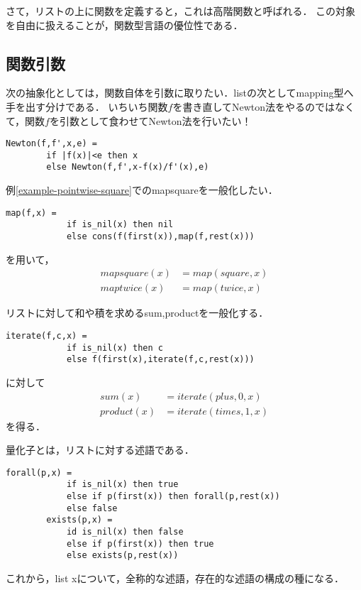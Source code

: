 \documentclass[uplatex, 12pt, dvipdfmx]{jsreport}
\begin{document}
さて，リストの上に関数を定義すると，これは高階関数と呼ばれる．
この対象を自由に扱えることが，関数型言語の優位性である．

\subsection{関数引数}

次の抽象化としては，関数自体を引数に取りたい．listの次としてmapping型へ手を出す分けである．
いちいち関数$f$を書き直してNewton法をやるのではなくて，関数$f$を引数として食わせてNewton法を行いたい！
\begin{lstlisting}[caption=Newton method]
    Newton(f,f',x,e) = 
        if |f(x)|<e then x
        else Newton(f,f',x-f(x)/f'(x),e)
\end{lstlisting}

\begin{example}[map]
    例\ref{example-pointwise-square}でのmapsquareを一般化したい．
    \begin{lstlisting}[caption=map]
        map(f,x) =
            if is_nil(x) then nil
            else cons(f(first(x)),map(f,rest(x)))
    \end{lstlisting}
    を用いて，
    \begin{align*}
        mapsquare(x) &= map(square,x)\\
        maptwice(x) &= map(twice,x)
    \end{align*}
\end{example}

\begin{example}[iterate]
    リストに対して和や積を求めるsum,productを一般化する．
    \begin{lstlisting}[caption=iteration]
        iterate(f,c,x) =
            if is_nil(x) then c
            else f(first(x),iterate(f,c,rest(x)))
    \end{lstlisting}
    に対して
    \begin{align*}
        sum(x) &= iterate(plus,0,x)\\
        product(x) &= iterate(times,1,x)
    \end{align*}
    を得る．
\end{example}

\begin{example}[forallとexists]
    量化子とは，リストに対する述語である．
    \begin{lstlisting}[caption=quantifier]
        forall(p,x) = 
            if is_nil(x) then true
            else if p(first(x)) then forall(p,rest(x))
            else false
        exists(p,x) =
            id is_nil(x) then false
            else if p(first(x)) then true
            else exists(p,rest(x))
    \end{lstlisting}
    これから，list xについて，全称的な述語，存在的な述語の構成の種になる．
\end{example}
\end{document}

